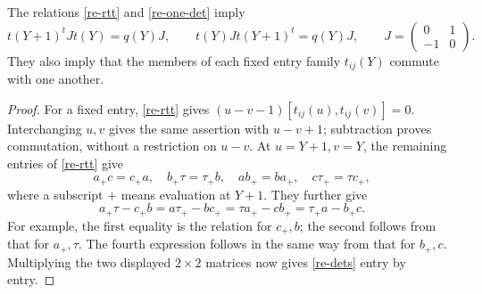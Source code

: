 \begin{lemma}\label{re-two-dets}
The relations \eqref{re-rtt} and \eqref{re-one-det} imply
\begin{equation}
 t(Y+1)^t Jt(Y)=q(Y)J,\qquad
 t(Y)Jt(Y+1)^t=q(Y)J,\qquad
 J=\begin{pmatrix}0&1\\-1&0\end{pmatrix}.       \label{re-dets}
\end{equation}
They also imply that the members of each fixed entry family
\(t_{ij}(Y)\) commute with one another.
\end{lemma}

\begin{proof}
For a fixed entry, \eqref{re-rtt} gives
\((u-v-1)[t_{ij}(u),t_{ij}(v)]=0\).
Interchanging \(u,v\) gives the same assertion with
\(u-v+1\); subtraction proves commutation, without a restriction
on \(u-v\).
At \(u=Y+1,v=Y\), the remaining entries of
\eqref{re-rtt} give
\[
 a_+c=c_+a,\quad b_+\tau=\tau_+b,\quad
 ab_+=ba_+,\quad c\tau_+=\tau c_+,
\]
where a subscript \(+\) means evaluation at \(Y+1\).
They further give
\[
 a_+\tau-c_+b=a\tau_+-bc_+
                         =\tau a_+-cb_+
                         =\tau_+a-b_+c.
\]
For example, the first equality is the relation for \(c_+,b\);
the second follows from that for \(a_+,\tau\).
The fourth expression follows in the same way from that for
\(b_+,c\).  Multiplying the two displayed \(2\times2\)
matrices now gives \eqref{re-dets} entry by entry.
\end{proof}

